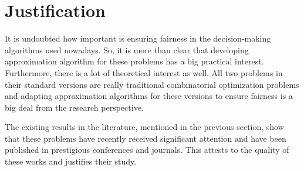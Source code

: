 \documentclass[12pt]{article}
\begin{document}


\section{Justification}
It is undoubted how important is ensuring fairness in the decision-making algorithms used nowadays. 
So, it is more than clear that developing approximation algorithm for these problems has a big practical interest. 
Furthermore, there is a lot of theoretical interest as well.
All two problems in their standard versions are really traditional combinatorial optimization problems and adapting approximation algorithms for these versions to ensure fairness is a big deal from the research perspective.

The existing results in the literature, mentioned in the previous section, show that these problems have recently received significant attention and have been published in prestigious conferences and journals. This attests to the quality of these works and justifies their study.
\end{document}
